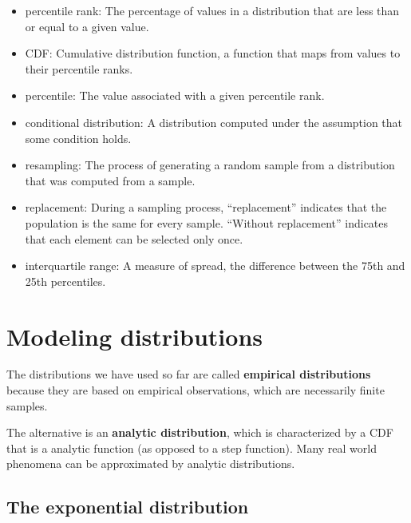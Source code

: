 \documentclass[12pt]{book}
\begin{document}
\begin{itemize}

\item percentile rank: The percentage of values in a distribution that are
less than or equal to a given value.

\item CDF: Cumulative distribution function, a function that maps
  from values to their percentile ranks.

\item percentile: The value associated with a given percentile rank.

\item conditional distribution: A distribution computed under the assumption
that some condition holds.

\item resampling: The process of generating a random sample from a
distribution that was computed from a sample.

\item replacement: During a sampling process, ``replacement'' indicates
that the population is the same for every sample.  ``Without replacement''
indicates that each element can be selected only once.

\item interquartile range: A measure of spread, the difference between
the 75th and 25th percentiles.

\end{itemize}


\chapter{Modeling distributions}
\label{analytic}

The distributions we have used so far are called {\bf
  empirical distributions} because they are based on empirical
observations, which are necessarily finite samples.

The alternative is an {\bf analytic distribution}, which is
characterized by a CDF that is a analytic function (as opposed to a
step function).  Many real world phenomena can be approximated by
analytic distributions.


\section{The exponential distribution}
\end{document}
